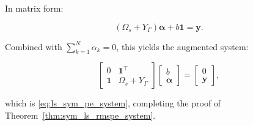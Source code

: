 \documentclass[mathematics,article,submit,pdftex,moreauthors]{Definitions/mdpi}
\begin{document}
In matrix form:
\begin{linenomath}
\begin{equation}
(\Omega_s + Y_\Gamma)\boldsymbol{\alpha} + b\mathbf{1} = \mathbf{y}.
\end{equation}
\end{linenomath}

Combined with $\sum_{k=1}^N \alpha_k = 0$, this yields the augmented system:
\begin{linenomath}
\begin{equation}
\begin{bmatrix}
0 & \mathbf{1}^\top\\
\mathbf{1} & \Omega_s + Y_\Gamma
\end{bmatrix}
\begin{bmatrix}
b\\
\boldsymbol{\alpha}
\end{bmatrix}
=
\begin{bmatrix}
0\\
\mathbf{y}
\end{bmatrix},
\end{equation}
\end{linenomath}
which is \eqref{eq:ls_sym_pe_system}, completing the proof of Theorem~\ref{thm:sym_ls_rmspe_system}.
\end{document}
